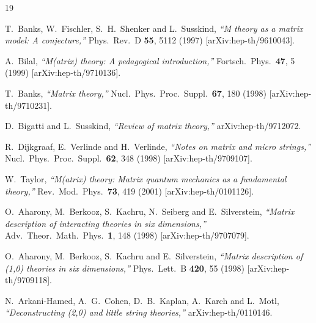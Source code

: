 \documentclass[nohyper,12pt,letterpaper]{JHEP3}
\begin{document}
\begin{thebibliography}{19}        %

T.~Banks, W.~Fischler, S.~H.~Shenker and L.~Susskind,
{\it ``M theory as a matrix model: A conjecture,''}
Phys.\ Rev.\ D {\bf 55}, 5112 (1997)
[arXiv:hep-th/9610043].

A.~Bilal,
{\it ``M(atrix) theory: A pedagogical introduction,''}
Fortsch.\ Phys.\  {\bf 47}, 5 (1999)
[arXiv:hep-th/9710136].

T.~Banks,
{\it ``Matrix theory,''}
Nucl.\ Phys.\ Proc.\ Suppl.\  {\bf 67}, 180 (1998)
[arXiv:hep-th/9710231].

D.~Bigatti and L.~Susskind,
{\it ``Review of matrix theory,''}
arXiv:hep-th/9712072.

R.~Dijkgraaf, E.~Verlinde and H.~Verlinde,
{\it ``Notes on matrix and micro strings,''}
Nucl.\ Phys.\ Proc.\ Suppl.\  {\bf 62}, 348 (1998)
[arXiv:hep-th/9709107].

W.~Taylor,
{\it ``M(atrix) theory: Matrix quantum mechanics as a fundamental 
theory,''}
Rev.\ Mod.\ Phys.\  {\bf 73}, 419 (2001)
[arXiv:hep-th/0101126].

O.~Aharony, M.~Berkooz, S.~Kachru, N.~Seiberg and E.~Silverstein,
{\it ``Matrix description of interacting theories in six dimensions,''}
Adv.\ Theor.\ Math.\ Phys.\  {\bf 1}, 148 (1998)
[arXiv:hep-th/9707079].

O.~Aharony, M.~Berkooz, S.~Kachru and E.~Silverstein,
{\it ``Matrix description of (1,0) theories in six dimensions,''}
Phys.\ Lett.\ B {\bf 420}, 55 (1998)
[arXiv:hep-th/9709118].

N.~Arkani-Hamed, A.~G.~Cohen, D.~B.~Kaplan, A.~Karch and L.~Motl,
{\it ``Deconstructing (2,0) and little string theories,''}
arXiv:hep-th/0110146.


\end{thebibliography}
\end{document}
